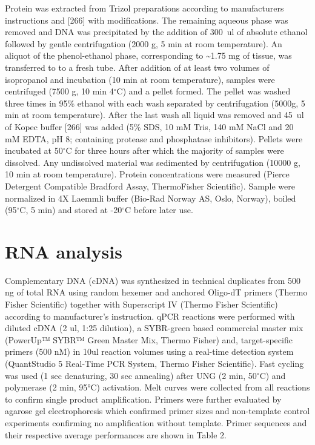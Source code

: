 \documentclass[twoside,10pt]{gihclass} %
\begin{document}
Protein was extracted from Trizol preparations according to manufacturers instructions and {[}266{]} with modifications. The remaining aqueous phase was removed and DNA was precipitated by the addition of \SI{300}{ul} of absolute ethanol followed by gentle centrifugation (2000 g, 5 min at room temperature). An aliquot of the phenol-ethanol phase, corresponding to \textasciitilde1.75 mg of tissue, was transferred to to a fresh tube. After addition of at least two volumes of isopropanol and incubation (10 min at room temperature), samples were centrifuged (7500 g, 10 min 4\(^{\circ}\)C) and a pellet formed. The pellet was washed three times in 95\% ethanol with each wash separated by centrifugation (5000g, 5 min at room temperature). After the last wash all liquid was removed and \SI{45}{ul} of Kopec buffer {[}266{]} was added (5\% SDS, 10 mM Tris, 140 mM NaCl and 20 mM EDTA, pH 8; containing protease and phosphatase inhibitors). Pellets were incubated at 50\(^{\circ}\)C for three hours after which the majority of samples were dissolved. Any undissolved material was sedimented by centrifugation (10000 g, 10 min at room temperature). Protein concentrations were measured (Pierce Detergent Compatible Bradford Assay, ThermoFisher Scientific). Sample were normalized in 4X Laemmli buffer (Bio-Rad Norway AS, Oslo, Norway), boiled (95\(^{\circ}\)C, 5 min) and stored at -20\(^{\circ}\)C before later use.

\hypertarget{rna-analysis}{%
\section{RNA analysis}\label{rna-analysis}}

Complementary DNA (cDNA) was synthesized in technical duplicates from 500 ng of total RNA using random hexemer and anchored Oligo-dT primers (Thermo Fisher Scientific) together with Superscript IV (Thermo Fisher Scientific) according to manufacturer's instruction. qPCR reactions were performed with diluted cDNA (2 ul, 1:25 dilution), a SYBR-green based commercial master mix (PowerUp™ SYBR™ Green Master Mix, Thermo Fisher) and, target-specific primers (500 nM) in 10ul reaction volumes using a real-time detection system (QuantStudio 5 Real-Time PCR System, Thermo Fisher Scientific). Fast cycling was used (1 sec denaturing, 30 sec annealing) after UNG (2 min, 50\(^{\circ}\)C) and polymerase (2 min, 95°C) activation. Melt curves were collected from all reactions to confirm single product amplification. Primers were further evaluated by agarose gel electrophoresis which confirmed primer sizes and non-template control experiments confirming no amplification without template. Primer sequences and their respective average performances are shown in Table 2.
\end{document}
